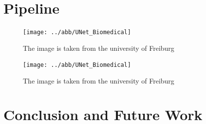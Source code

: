 \documentclass[oneside]{htwg-report}
\begin{document}
\section*{Pipeline}

\begin{figure}[ht]
    \centering
    \texttt{[image: ../abb/UNet\_Biomedical]}
    \caption{The image is taken from the university of Freiburg~\cite{ronneberger2015u}}
\end{figure}



\begin{figure}[ht]
    \centering
    \texttt{[image: ../abb/UNet\_Biomedical]}
    \caption{The image is taken from the university of Freiburg~\cite{ronneberger2015u}}
\end{figure}

\section*{Conclusion and Future Work}
\end{document}
